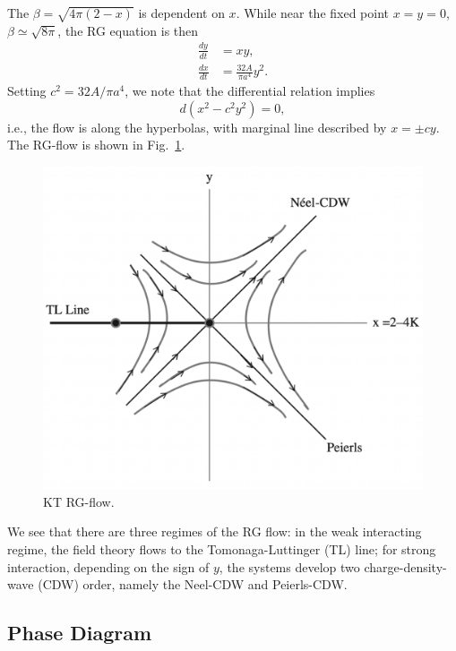 The $\beta = \sqrt{4\pi(2-x)}$ is dependent on $x$.
While near the fixed point $x=y=0$, $\beta \simeq \sqrt{8\pi}$, the RG equation is then
\begin{equation}
\begin{aligned}
	\frac{dy}{dt} &= xy, \\
	\frac{dx}{dt} &= \frac{32 A}{\pi a^4} y^2.
\end{aligned}
\end{equation}
Setting $c^2 = 32A/\pi a^4$, we note that the differential relation implies
\begin{equation}
	d(x^2- c^2 y^2) = 0,
\end{equation}
i.e., the flow is along the hyperbolas, with marginal line described by $x = \pm cy$.
The RG-flow is shown in Fig.~\ref{fig:FL-RG-flow}.

\begin{figure}
	\centering
	\includegraphics[width=0.5\linewidth]{pics/LL-RG-flow}
	\caption{KT RG-flow.}
	\label{fig:FL-RG-flow}
\end{figure}

We see that there are three regimes of the RG flow: in the weak interacting regime, the field theory flows to the Tomonaga-Luttinger (TL) line; for strong interaction, depending on the sign of $y$, the systems develop two charge-density-wave (CDW) order, namely the Neel-CDW and Peierls-CDW.


\subsection{Phase Diagram}

